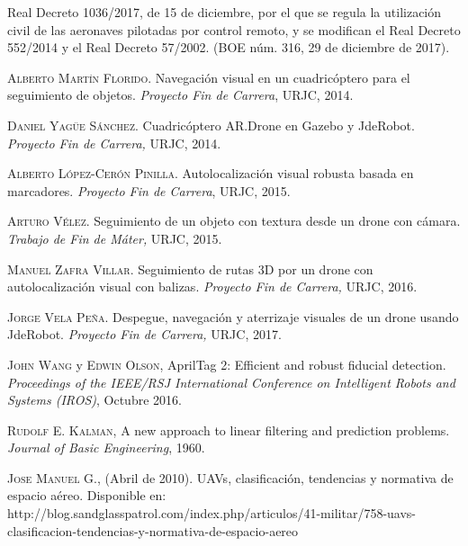 \documentclass[a4paper, 12pt, oneside]{book}
\begin{document}
\begin{thebibliography}{X}
 Real Decreto 1036/2017, de 15 de diciembre, por el que se regula la utilización 
civil  de  las  aeronaves  pilotadas  por  control  remoto,  y  se  modifican  el  Real  
Decreto 552/2014 y el Real Decreto 57/2002. (BOE núm. 316, 29 de diciembre de 2017).

 \textsc{Alberto Martín Florido.} Navegación visual en un cuadricóptero para el seguimiento de objetos. \textit{Proyecto Fin de Carrera}, URJC, 2014.	

 \textsc{Daniel Yagüe Sánchez.} Cuadricóptero AR.Drone en Gazebo y JdeRobot. \textit{Proyecto Fin de Carrera,} URJC, 2014.

 \textsc{Alberto López-Cerón Pinilla.} Autolocalización visual robusta basada en marcadores. \textit{Proyecto Fin de Carrera}, URJC, 2015.

 \textsc{Arturo Vélez.}  Seguimiento de un objeto con textura desde un drone con cámara. \textit{Trabajo de Fin de Máter,} URJC, 2015.

 \textsc{Manuel Zafra Villar.} Seguimiento de rutas 3D por un drone con autolocalización visual con balizas. \textit{Proyecto Fin de Carrera,} URJC, 2016.

 \textsc{Jorge Vela Peña.} Despegue, navegación y aterrizaje visuales de un drone usando JdeRobot. \textit{Proyecto Fin de Carrera,} URJC, 2017. 

 \textsc{John Wang} y \textsc{Edwin Olson}, AprilTag 2: Efficient and robust fiducial detection. \textit{Proceedings of the IEEE/RSJ International Conference on Intelligent Robots and Systems (IROS)}, Octubre 2016.
	
 \textsc{Rudolf E. Kalman}, A new approach to linear filtering and prediction problems.
\textit{Journal of Basic Engineering}, 1960.

 \textsc{Jose Manuel G.}, (Abril de 2010). UAVs, clasificación, tendencias y normativa de espacio aéreo. Disponible en: \\ http://blog.sandglasspatrol.com/index.php/articulos/41-militar/758-uavs-clasificacion-tendencias-y-normativa-de-espacio-aereo

\end{thebibliography} 
\end{document}
